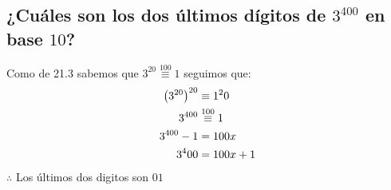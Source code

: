 \documentclass[14pt]{extarticle}
\begin{document}
    \subsection{¿Cuáles son los dos últimos dígitos de $3^{400}$ en base $10$?}
        Como de 21.3 sabemos que $3^{20} \stackrel{100}{\equiv} 1$ seguimos que: \\
        \begin{align}
            \notag \left(3^{20}\right)^{20} &\equiv 1^20 \\
            \notag 3^{400} &\stackrel{100}{\equiv} 1 \\
            \notag 3^{400}-1 &= 100x \\
            \notag 3^400 &= 100x+1
        \end{align}
        $\therefore$ Los últimos dos digitos son $01$
\end{document}
